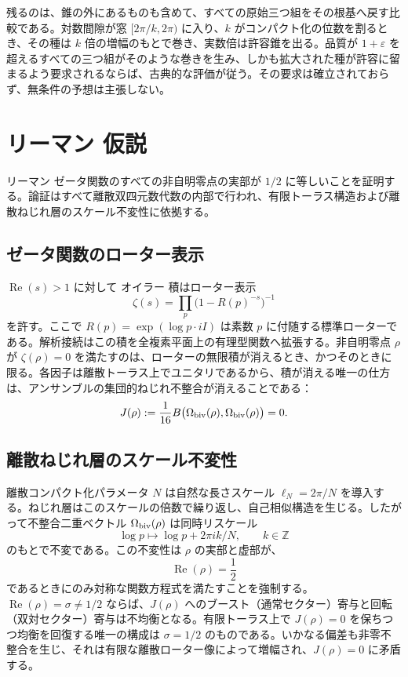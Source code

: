 \documentclass[a4paper]{article}
\theoremstyle{definition}
\theoremstyle{remark}
\begin{document}
残るのは、錐の外にあるものも含めて、すべての原始三つ組をその根基へ戻す比較である。対数間隙が窓 \([2\pi/k,2\pi)\) に入り、\(k\) がコンパクト化の位数を割るとき、その種は \(k\) 倍の増幅のもとで巻き、実数倍は許容錐を出る。品質が \(1+\varepsilon\) を超えるすべての三つ組がそのような巻きを生み、しかも拡大された種が許容に留まるよう要求されるならば、古典的な評価が従う。その要求は確立されておらず、無条件の予想は主張しない。

\section{リーマン 仮説}

リーマン ゼータ関数のすべての非自明零点の実部が \( 1/2 \) に等しいことを証明する。論証はすべて離散双四元数代数の内部で行われ、有限トーラス構造および離散ねじれ層のスケール不変性に依拠する。

\subsection{ゼータ関数のローター表示}

\(\operatorname{Re}(s) > 1\) に対して オイラー 積はローター表示
\[
\zeta(s) = \prod_p \bigl(1 - R(p)^{-s}\bigr)^{-1}
\]
を許す。ここで \( R(p) = \exp(\log p \cdot iI) \) は素数 \( p \) に付随する標準ローターである。解析接続はこの積を全複素平面上の有理型関数へ拡張する。非自明零点 \( \rho \) が \(\zeta(\rho) = 0\) を満たすのは、ローターの無限積が消えるとき、かつそのときに限る。各因子は離散トーラス上でユニタリであるから、積が消える唯一の仕方は、アンサンブルの集団的ねじれ不整合が消えることである：
\[
J(\rho) := \frac{1}{16} B\bigl(\Omega_{\rm biv}(\rho), \Omega_{\rm biv}(\rho)\bigr) = 0.
\]

\subsection{離散ねじれ層のスケール不変性}

離散コンパクト化パラメータ \( N \) は自然な長さスケール \(\ell_N = 2\pi / N\) を導入する。ねじれ層はこのスケールの倍数で繰り返し、自己相似構造を生じる。したがって不整合二重ベクトル \(\Omega_{\rm biv}(\rho)\) は同時リスケール
\[
\log p \mapsto \log p + 2\pi i k / N, \qquad k \in \mathbb{Z}
\]
のもとで不変である。この不変性は \(\rho\) の実部と虚部が、
\[
\operatorname{Re}(\rho) = \frac12
\]
であるときにのみ対称な関数方程式を満たすことを強制する。\(\operatorname{Re}(\rho) = \sigma \neq 1/2\) ならば、\(J(\rho)\) へのブースト（通常セクター）寄与と回転（双対セクター）寄与は不均衡となる。有限トーラス上で \(J(\rho) = 0\) を保ちつつ均衡を回復する唯一の構成は \(\sigma = 1/2\) のものである。いかなる偏差も非零不整合を生じ、それは有限な離散ローター像によって増幅され、\(J(\rho) = 0\) に矛盾する。
\end{document}

